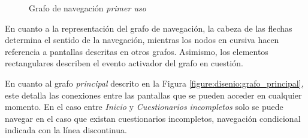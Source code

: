             \begin{figure}[h]
                \centering
                \caption{Grafo de navegación \textit{primer uso}}
                \label{figure:disenio:grafo_primer_uso}
            \end{figure}

            En cuanto a la representación del grafo de navegación, la cabeza de las flechas determina el sentido de la navegación, mientras los nodos en cursiva hacen referencia a pantallas descritas en otros grafos. Asimismo, los elementos rectangulares describen el evento activador del grafo en cuestión.
            
            En cuanto al grafo \textit{principal} descrito en la Figura \ref{figure:disenio:grafo_principal}, este detalla las conexiones entre las pantallas que se pueden acceder en cualquier momento. En el caso entre \textit{Inicio} y \textit{Cuestionarios incompletos} solo se puede navegar en el caso que existan cuestionarios incompletos, navegación condicional indicada con la línea discontinua.
            
